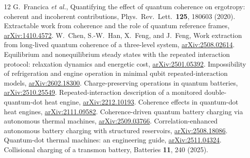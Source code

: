 \documentclass[11pt,a4paper]{article}
\begin{document}
\begin{thebibliography}{12}
 G.~Francica \emph{et al.}, Quantifying the effect of quantum coherence on ergotropy: coherent and incoherent contributions, Phys.\ Rev.\ Lett.\ \textbf{125}, 180603 (2020).
 Extractable work from coherence and the role of quantum reference frames, \href{https://arxiv.org/abs/1410.4572}{arXiv:1410.4572}.
 W.~Chen, S.-W.~Han, X.~Feng, and J.~Feng, Work extraction from long-lived quantum coherence of a three-level system, \href{https://arxiv.org/abs/2508.02614}{arXiv:2508.02614}.
 Equilibrium and nonequilibrium steady states with the repeated interaction protocol: relaxation dynamics and energetic cost, \href{https://arxiv.org/abs/2501.05392}{arXiv:2501.05392}.
 Impossibility of refrigeration and engine operation in minimal qubit repeated-interaction models, \href{https://arxiv.org/abs/2602.18300}{arXiv:2602.18300}.
 Charge-preserving operations in quantum batteries, \href{https://arxiv.org/abs/2510.25549}{arXiv:2510.25549}.
 Repeated-interaction description of a monitored double-quantum-dot heat engine, \href{https://arxiv.org/abs/2212.10193}{arXiv:2212.10193}.
 Coherence effects in quantum-dot heat engines, \href{https://arxiv.org/abs/2111.09582}{arXiv:2111.09582}.
 Coherence-driven quantum battery charging via autonomous thermal machines, \href{https://arxiv.org/abs/2509.03766}{arXiv:2509.03766}.
 Correlation-enhanced autonomous battery charging with structured reservoirs, \href{https://arxiv.org/abs/2508.18086}{arXiv:2508.18086}.
 Quantum-dot thermal machines: an engineering guide, \href{https://arxiv.org/abs/2511.04324}{arXiv:2511.04324}.
 Collisional charging of a transmon battery, Batteries \textbf{11}, 240 (2025).
\end{thebibliography}
\end{document}
